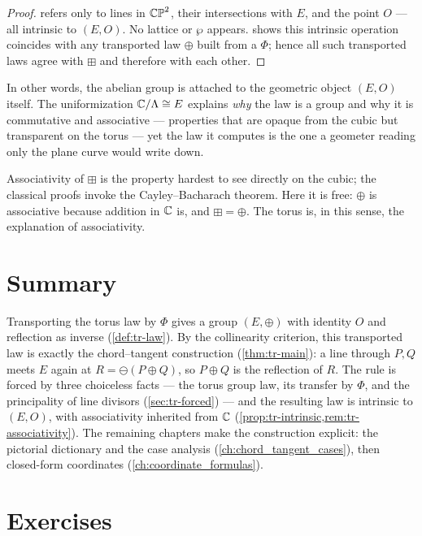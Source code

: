 \begin{proof}
 refers only to lines in \(\mathbb{CP}^2\), their
intersections with \(E\), and the point \(O\) --- all intrinsic to \((E, O)\). No
lattice or \(\wp\) appears.  shows this intrinsic operation
coincides with any transported law \(\oplus\) built from a \(\Phi\); hence all such
transported laws agree with \(\boxplus\) and therefore with each other.
\end{proof}

In other words, the abelian group is attached to the geometric object \((E, O)\)
itself. The uniformization \(\mathbb{C}/\Lambda \cong E\) explains \emph{why} the law is a
group and why it is commutative and associative --- properties that are opaque from
the cubic but transparent on the torus --- yet the law it computes is the one a
geometer reading only the plane curve would write down.

\begin{remark}
\label{rem:tr-associativity}
Associativity of \(\boxplus\) is the property hardest to see directly on the cubic;
the classical proofs invoke the Cayley--Bacharach theorem. Here it is free: \(\oplus\)
is associative because addition in \(\mathbb{C}\) is, and \(\boxplus = \oplus\). The torus
is, in this sense, the explanation of associativity.
\end{remark}

\section{Summary}
\label{sec:tr-summary}

Transporting the torus law by \(\Phi\) gives a group \((E, \oplus)\) with identity
\(O\) and reflection as inverse (\cref{def:tr-law}). By the collinearity criterion,
this transported law is exactly the chord--tangent construction
(\cref{thm:tr-main}): a line through \(P, Q\) meets \(E\) again at
\(R = \ominus(P\oplus Q)\), so \(P \oplus Q\) is the reflection of \(R\). The rule
is forced by three choiceless facts --- the torus group law, its transfer by
\(\Phi\), and the principality of line divisors (\cref{sec:tr-forced}) --- and the
resulting law is intrinsic to \((E, O)\), with associativity inherited from \(\mathbb{C}\)
(\cref{prop:tr-intrinsic,rem:tr-associativity}). The remaining chapters make the
construction explicit: the pictorial dictionary and the case analysis
(\cref{ch:chord_tangent_cases}), then closed-form coordinates
(\cref{ch:coordinate_formulas}).

\section*{Exercises}


